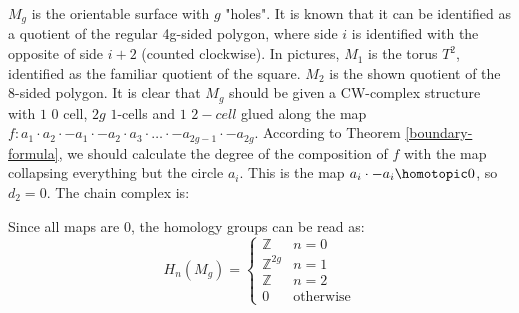 \begin{example}
$M_g$ is the orientable surface with $g$ "holes". It is known that it can be identified as a quotient of the regular 4g-sided polygon, where side $i$ is identified with the opposite of side $i+2$ (counted clockwise). In pictures,  $M_1$ is the torus $T^2$, identified as the familiar quotient of the square. $M_2$ is the shown quotient of the 8-sided polygon. It is clear that $M_g$ should be given a CW-complex structure with $1$ $0$ cell, $2g$ $1$-cells and $1$ $2-cell$ glued along the map $f: a_1\cdot a_2 \cdot -a_1 \cdot -a_2 \cdot a_3 \cdot \dots \cdot -a_{2g-1} \cdot -a_{2g}$. According to Theorem \ref{boundary-formula}, we should calculate the degree of the composition of $f$ with the map collapsing everything but the circle $a_i$. This is the map $a_i\cdot -a_i\homotopic 0$, so $d_2=0$. The chain complex is:


Since all maps are $0$, the homology groups can be read as:
$$H_n(M_g)=\begin{cases}\mathbb{Z} & n=0\\
\mathbb{Z}^{2g}& n=1\\
\mathbb{Z} & n=2 \\
0 & \text{otherwise}\end{cases}$$
\end{example}

